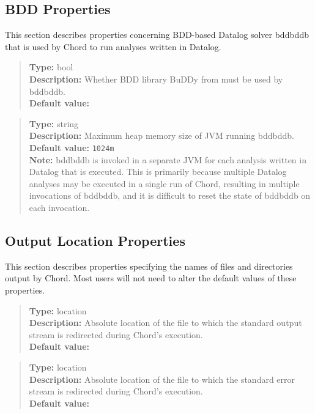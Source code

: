 \subsection{BDD Properties}
\label{sec:bdd-props}

This section describes properties concerning BDD-based Datalog solver bddbddb that is used by Chord to run analyses written in Datalog.

\begin{quote}
{\bf Type:} bool \\
{\bf Description:} Whether BDD library BuDDy from  must be used by bddbddb. \\
{\bf Default value:} 
\end{quote}

\begin{quote}
{\bf Type:} string \\
{\bf Description:} Maximum heap memory size of JVM running bddbddb. \\
{\bf Default value:} {\tt 1024m} \\
{\bf Note:} bddbddb is invoked in a separate JVM for each analysis written in Datalog that is executed.
This is primarily because multiple Datalog analyses may be executed in a single run of Chord,
resulting in multiple invocations of bddbddb, and it is difficult to reset the state of bddbddb on each invocation. 
\end{quote}

\subsection{Output Location Properties}
\label{sec:output-props}

This section describes properties specifying the names of files and directories output by Chord.
Most users will not need to alter the default values of these properties.

\begin{quote}
{\bf Type:} location \\
{\bf Description:} Absolute location of the file to which the standard output stream is redirected during Chord's execution. \\
{\bf Default value:} 
\end{quote}

\begin{quote}
{\bf Type:} location  \\
{\bf Description:} Absolute location of the file to which the standard error stream is redirected during Chord's execution. \\
{\bf Default value:} 
\end{quote}

